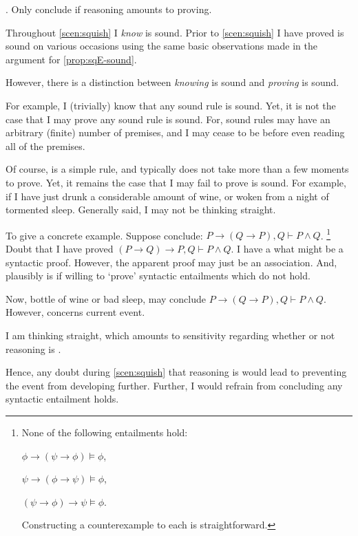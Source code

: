 \begin{note}
  .
  Only conclude if reasoning amounts to proving.

  Throughout \autoref{scen:squish} I \emph{know} \sqE{} is sound.
  Prior to \autoref{scen:squish} I have proved \sqE{} is sound on various occasions using the same basic observations made in the argument for \autoref{prop:sqE-sound}.

  However, there is a distinction between \emph{knowing} \sqE{} is sound and \emph{proving} \sqE{} is sound.

  For example, I (trivially) know that any sound rule is sound.
  Yet, it is not the case that I may prove any sound rule is sound.
  For, sound rules may have an arbitrary (finite) number of premises, and I may cease to be before even reading all of the premises.

  Of course, \sqE{} is a simple rule, and typically does not take more than a few moments to prove.
  Yet, it remains the case that I may fail to prove \sqE{} is sound.
  For example, if I have just drunk a considerable amount of wine, or woken from a night of tormented sleep.
  Generally said, I may not be thinking straight.

  To give a concrete example.
  Suppose conclude:
  \(P \rightarrow (Q \rightarrow P), Q \vdash P \land Q\).%
  \footnote{
    None of the following entailments hold:
    \begin{enumerate*}[noitemsep, label=]
    \item
      \(\phi \rightarrow (\psi \rightarrow \phi) \vDash \phi\),
    \item
      \(\psi \rightarrow (\phi \rightarrow \psi) \vDash \phi\),
    \item
      \((\psi \rightarrow \phi) \rightarrow \psi \vDash \phi\).
    \end{enumerate*}
    Constructing a counterexample to each is straightforward.
  }
  Doubt that I have proved \((P \rightarrow Q) \rightarrow P, Q \vdash P \land Q\).
  I have a what might be a syntactic proof.
  However, the apparent proof may just be an association.
  And, plausibly is if willing to `prove' syntactic entailments which do not hold.
\end{note}

\begin{note}
  Now, bottle of wine or bad sleep, may conclude \(P \rightarrow (Q \rightarrow P), Q \vdash P \land Q\).
  However, \requ{} concerns current event.

  I am thinking straight, which amounts to sensitivity regarding whether or not reasoning is .

  Hence, any doubt during \autoref{scen:squish} that reasoning is  would lead to preventing the event from developing further.
  Further, I would refrain from concluding any syntactic entailment holds.
\end{note}

